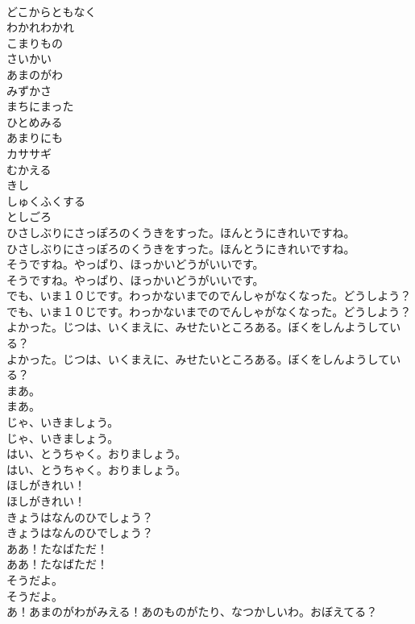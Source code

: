 \documentclass[8pt]{extreport}
\begin{document}
\begin{CJK}{UTF8}{min}
\\	どこからともなく
\\	わかれわかれ
\\	こまりもの
\\	さいかい
\\	あまのがわ
\\	みずかさ
\\	まちにまった
\\	ひとめみる
\\	あまりにも
\\	カササギ
\\	むかえる
\\	きし
\\	しゅくふくする
\\	としごろ
\\	ひさしぶりにさっぽろのくうきをすった。ほんとうにきれいですね。	
\\	ひさしぶりにさっぽろのくうきをすった。ほんとうにきれいですね。 
\\	そうですね。やっぱり、ほっかいどうがいいです。	
\\	そうですね。やっぱり、ほっかいどうがいいです。 
\\	でも、いま１０じです。わっかないまでのでんしゃがなくなった。どうしよう？	
\\	でも、いま１０じです。わっかないまでのでんしゃがなくなった。どうしよう？ 
\\	よかった。じつは、いくまえに、みせたいところある。ぼくをしんようしている？	
\\	よかった。じつは、いくまえに、みせたいところある。ぼくをしんようしている？ 
\\	まあ。	
\\	まあ。 
\\	じゃ、いきましょう。	
\\	じゃ、いきましょう。 
\\	はい、とうちゃく。おりましょう。	
\\	はい、とうちゃく。おりましょう。 
\\	ほしがきれい！	
\\	ほしがきれい！ 
\\	きょうはなんのひでしょう？	
\\	きょうはなんのひでしょう？ 
\\	ああ！たなばただ！	
\\	ああ！たなばただ！ 
\\	そうだよ。	
\\	そうだよ。 
\\	あ！あまのがわがみえる！あのものがたり、なつかしいわ。おぼえてる？	

\end{CJK}
\end{document}
